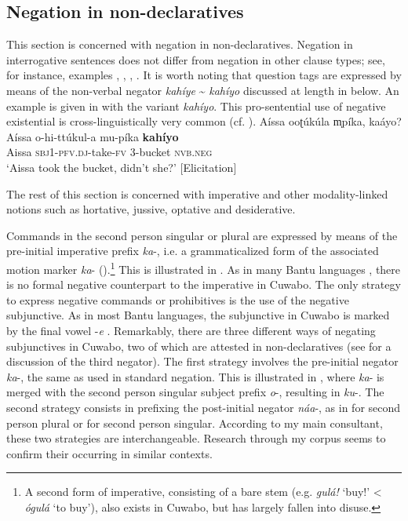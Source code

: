 \documentclass[output=paper,colorlinks=true, citecolor=brown,draftmode]{langscibook}
\begin{document}
\subsection{Negation in non-declaratives}\label{sec:cuw:2.2} 
This section is concerned with negation in non-declaratives. Negation in interrogative sentences does not differ from negation in other clause types; see, for instance, examples , , , . It is worth noting that question tags are expressed by means of the non-verbal negator \textit{kahíye} {\textasciitilde} \textit{kahíyo} discussed at length in  below.
An example is given in  with the variant \textit{kahíyo}. This pro-sentential use of negative existential is cross-linguistically very common (cf. \citealt{Veselinova2013neg.exist}).
\ea\label{ex:cuw:additional} Aíssa ooʈúkúla m̩píka, kaáyo? \\ 
    \gll  Aíssa o-hi-ttúkul-a mu-píka \textbf{kahíyo}\\
          Aissa \textsc{sbj1-pfv.dj}{}-take\textsc{{}-fv} 3-bucket \textsc{nvb.neg}\\
    \glt ‘Aissa took the bucket, didn’t she?’ [Elicitation]
\z 


The rest of this section is concerned with imperative and other modality-linked notions such as hortative, jussive, optative and desiderative.

Commands in the second person singular or plural are expressed by means of the pre-initial imperative prefix \textit{ka}{}-, i.e. a grammaticalized form of the associated motion marker \textit{ka}{}- (\citealt{GuéroisEtAl2021}).\footnote{A second form of imperative, consisting of a bare stem (e.g. \textit{gulá!} ‘buy!’ < \textit{ógulá} ‘to buy’), also exists in Cuwabo, but has largely fallen into disuse.} This is illustrated in . As in many Bantu languages \citep[192]{Nurse2008}, there is no formal negative counterpart to the imperative in Cuwabo. The only strategy to express negative commands or prohibitives is the use of the negative subjunctive. As in most Bantu languages, the subjunctive in Cuwabo is marked by the final vowel -\textit{e} \citep[261]{Nurse2008}. Remarkably, there are three different ways of negating subjunctives in Cuwabo, two of which are attested in non-declaratives (see  for a discussion of the third negator). The first strategy involves the pre-initial negator \textit{ka}{}-, the same as used in standard negation. This is illustrated in , where \textit{ka}{}- is merged with the second person singular subject prefix \textit{o}{}-, resulting in \textit{ku}{}-. The second strategy consists in prefixing the post-initial negator \textit{náa}{}-, as in  for second person plural or  for second person singular. According to my main consultant, these two strategies are interchangeable. Research through my corpus seems to confirm their occurring in similar contexts.
\end{document}

